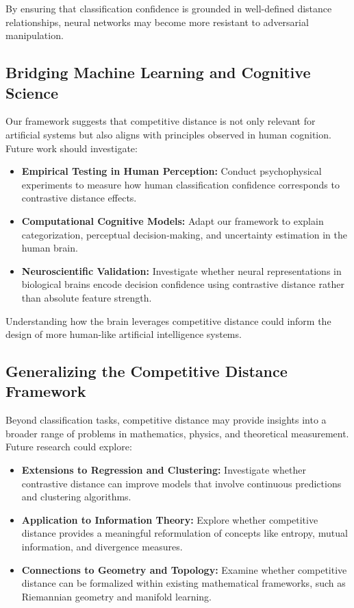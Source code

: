 By ensuring that classification confidence is grounded in well-defined distance relationships, neural networks may become more resistant to adversarial manipulation.

\subsection{Bridging Machine Learning and Cognitive Science}

Our framework suggests that competitive distance is not only relevant for artificial systems but also aligns with principles observed in human cognition. Future work should investigate:

\begin{itemize}
    \item \textbf{Empirical Testing in Human Perception:} Conduct psychophysical experiments to measure how human classification confidence corresponds to contrastive distance effects.
    \item \textbf{Computational Cognitive Models:} Adapt our framework to explain categorization, perceptual decision-making, and uncertainty estimation in the human brain.
    \item \textbf{Neuroscientific Validation:} Investigate whether neural representations in biological brains encode decision confidence using contrastive distance rather than absolute feature strength.
\end{itemize}

Understanding how the brain leverages competitive distance could inform the design of more human-like artificial intelligence systems.

\subsection{Generalizing the Competitive Distance Framework}

Beyond classification tasks, competitive distance may provide insights into a broader range of problems in mathematics, physics, and theoretical measurement. Future research could explore:

\begin{itemize}
    \item \textbf{Extensions to Regression and Clustering:} Investigate whether contrastive distance can improve models that involve continuous predictions and clustering algorithms.
    \item \textbf{Application to Information Theory:} Explore whether competitive distance provides a meaningful reformulation of concepts like entropy, mutual information, and divergence measures.
    \item \textbf{Connections to Geometry and Topology:} Examine whether competitive distance can be formalized within existing mathematical frameworks, such as Riemannian geometry and manifold learning.
\end{itemize}

